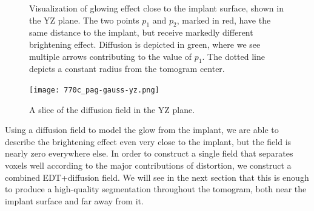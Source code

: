 \begin{figure}
    \vspace{-1.5cm}
    \centering
      \vspace{-3.5cm}
      \caption{Visualization of glowing effect close to the implant surface, shown in the YZ plane. 
        The two points $p_1$ and $p_2$, marked in red, have the same distance to the implant, but receive markedly different brightening effect.
        Diffusion is depicted in green, where we see multiple arrows contributing to the value of $p_1$. The dotted line depicts a constant radius from the tomogram center.}
    \label{fig:edt-vs-diffusion}
\end{figure}


\begin{figure}
    \texttt{[image: 770c\_pag-gauss-yz.png]}
    \caption{A slice of the diffusion field in the YZ plane.}
    \label{fig:field-slice}
\end{figure}

Using a diffusion field to model the glow from the implant, we are able to describe the brightening effect even very close to the implant, but the field is nearly
zero everywhere else. In order
to construct a single field that separates voxels well according to the major contributions of distortion, we construct a combined EDT+diffusion field. We will see
in the next section that this is enough to produce a high-quality segmentation throughout the tomogram, both near the implant surface and far away from it.


